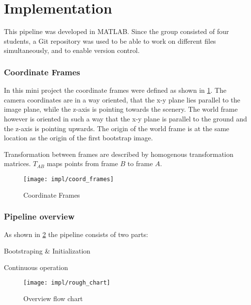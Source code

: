 \section{Implementation}

This pipeline was developed in MATLAB. Since the group consisted of four students, a Git repository was used to be able to work on different files simultaneously, and to enable version control.

\subsubsection{Coordinate Frames}
In this mini project the coordinate frames were defined as shown in \cref{img_coord_frames}. The camera coordinates are in a way oriented, that the x-y plane lies parallel to the image plane, while the z-axis is pointing towards the scenery. The world frame however is oriented in such a way that the x-y plane is parallel to the ground and the z-axis is pointing upwards. The origin of the world frame is at the same location as the origin of the first bootstrap image.

Transformation between frames are described by homogenous transformation matrices. $T_{AB}$ maps points from frame $B$ to frame $A$.

\begin{figure}[ht]
	\centering
	\texttt{[image: impl/coord\_frames]}
	\caption{Coordinate Frames}
	\label{img_coord_frames}
\end{figure}

\subsubsection{Pipeline overview}
As shown in \cref{img_flow_rough} the pipeline consists of two parts:
\begin{compactenum}
	\item Bootstraping \& Initialization
	\item Continuous operation
\end{compactenum}

\begin{figure}[ht]
	\centering
	\texttt{[image: impl/rough\_chart]}
	\caption{Overview flow chart}
	\label{img_flow_rough}
\end{figure}

